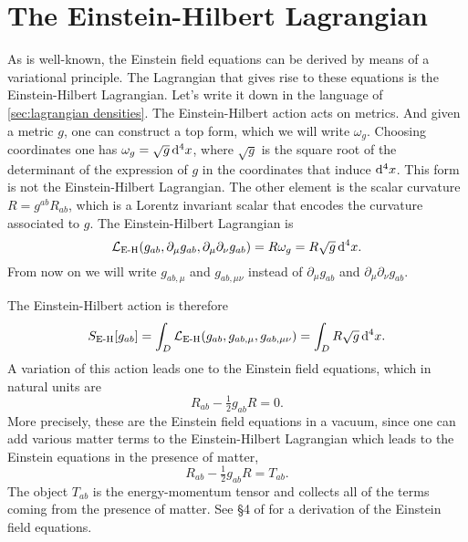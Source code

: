 \documentclass[../main.tex]{subfiles}
\begin{document}
\section{The Einstein-Hilbert Lagrangian}
As is well-known, the Einstein field equations can be derived by means of a variational
principle. The Lagrangian that gives rise to these equations is the Einstein-Hilbert
Lagrangian. Let's write it down in the language of \cref{sec:lagrangian densities}. The
Einstein-Hilbert action acts on metrics. And given a metric \( g \), one can construct a
top form, which we will write \( \omega_g \). Choosing coordinates one has \( \omega_g =
\sqrt{g} \,\mathrm{d}^4 x \), where \( \sqrt{g} \) is the square root of the determinant of the
expression of \( g \) in the coordinates that induce \( \mathrm{d}^4 x \). This form is not the
Einstein-Hilbert Lagrangian. The other element is the scalar curvature \( R = g^{ab}R_{ab}
\), which is a Lorentz invariant scalar that encodes the curvature associated to \( g \).
The Einstein-Hilbert Lagrangian is
\begin{equation}\label{eq:EH lagrangian}
	\mathcal{L}_{\text{E-H}}(g_{ab}, \partial_\mu g_{ab}, \partial_\mu \partial_\nu g_{ab}) =
	R\omega_g = R \sqrt{g}\,\mathrm{d}^4 x.
\end{equation}
From now on we will write \( g_{ab,\mu} \) and \( g_{ab,\mu\nu} \) instead of \(
\partial_\mu g_{ab} \) and \( \partial_\mu\partial_\nu g_{ab} \). 

The Einstein-Hilbert action is therefore
\begin{equation} \label{eq:EH action}
	S_{\text{E-H}}[g_{ab}] = \int_D \mathcal{L}_\text{E-H}(g_{ab}, g_{ab,\mu}, g_{ab,\mu\nu}) = \int_D R
	\sqrt{g}\,\mathrm{d}^4x.
\end{equation}
A variation of this action leads one to the Einstein field equations, which in natural
units are
\begin{equation} \label{eq:EFE vacuum}
	R_{ab} - \tfrac{1}{2}g_{ab}R = 0. 
\end{equation}
More precisely, these are the Einstein field equations in a vacuum, since one can add
various matter terms to the Einstein-Hilbert Lagrangian which leads to the Einstein
equations in the presence of matter,
\begin{equation} \label{eq:EFE matter}
	R_{ab} - \tfrac{1}{2}g_{ab}R = T_{ab}. 
\end{equation}
The object \( T_{ab} \) is the energy-momentum tensor and collects all of the terms coming
from the presence of matter. See \S4 of \cite{Carroll1997} for a derivation of the
Einstein field equations. 
\end{document}
